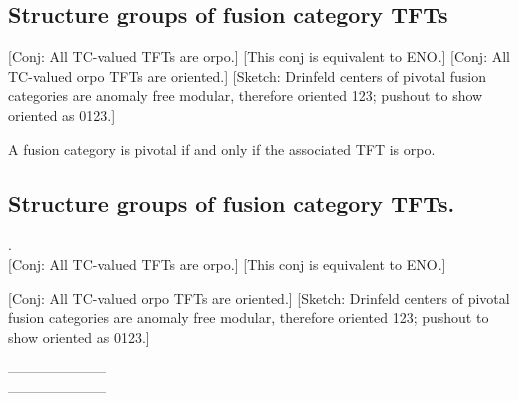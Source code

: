 \documentclass{amsart}
\begin{document}
\subsection{Structure groups of fusion category TFTs}
   [Conj: All TC-valued TFTs are orpo.] [This conj is equivalent to ENO.]
   [Conj: All TC-valued orpo TFTs are oriented.] [Sketch: Drinfeld centers of pivotal fusion categories are anomaly free modular, therefore oriented 123; pushout to show oriented as 0123.]

\begin{theorem}
A fusion category is pivotal if and only if the associated TFT is orpo.
\end{theorem}

\subsection{Structure groups of fusion category TFTs.} .\\

	[Conj: All TC-valued TFTs are orpo.] [This conj is equivalent to ENO.]
	
	[Conj: All TC-valued orpo TFTs are oriented.] [Sketch: Drinfeld centers of pivotal fusion categories are anomaly free modular, therefore oriented 123; pushout to show oriented as 0123.]



\nid ---------------------\\
---------------------




\end{document}

